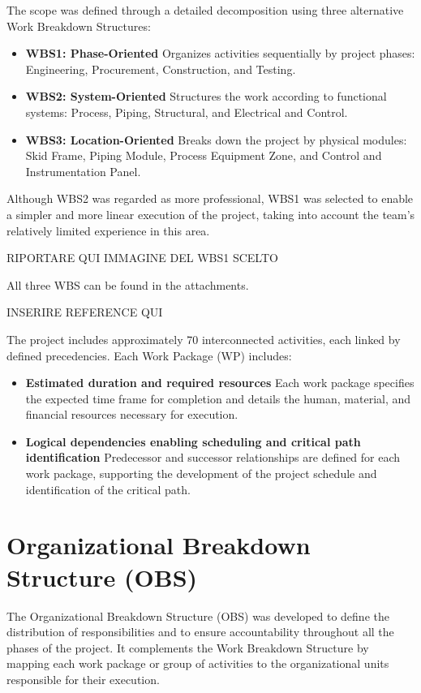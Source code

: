 \documentclass[12pt]{article}
\begin{document}
The scope was defined through a detailed decomposition using three alternative Work Breakdown Structures:
\begin{itemize}
        \item \textbf{WBS1: Phase-Oriented}
              Organizes activities sequentially by project phases: Engineering, Procurement, Construction, and Testing.
        \item \textbf{WBS2: System-Oriented}
              Structures the work according to functional systems: Process, Piping, Structural, and Electrical and Control.
        \item \textbf{WBS3: Location-Oriented}
              Breaks down the project by physical modules: Skid Frame, Piping Module, Process Equipment Zone, and Control and Instrumentation Panel.
\end{itemize}
Although WBS2 was regarded as more professional, WBS1 was selected to enable a simpler and more linear execution of the project, taking into account the team’s relatively limited experience in this area.

RIPORTARE QUI IMMAGINE DEL WBS1 SCELTO

All three WBS can be found in the attachments.

INSERIRE REFERENCE QUI

The project includes approximately 70 interconnected activities, each linked by defined precedencies.
Each Work Package (WP) includes:
\begin{itemize}
        \item \textbf{Estimated duration and required resources}
              Each work package specifies the expected time frame for completion and details the human, material, and financial resources necessary for execution.
        \item \textbf{Logical dependencies enabling scheduling and critical path identification}
              Predecessor and successor relationships are defined for each work package, supporting the development of the project schedule and identification of the critical path.
\end{itemize}

\section{Organizational Breakdown Structure (OBS)}

The Organizational Breakdown Structure (OBS) was developed to define the distribution of responsibilities and to ensure accountability throughout all the phases of the project. It complements the Work Breakdown Structure by mapping each work package or group of activities to the organizational units responsible for their execution.
\end{document}
